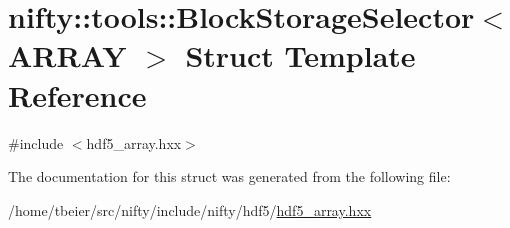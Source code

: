 \hypertarget{structnifty_1_1tools_1_1BlockStorageSelector}{}\section{nifty\+:\+:tools\+:\+:Block\+Storage\+Selector$<$ A\+R\+R\+AY $>$ Struct Template Reference}
\label{structnifty_1_1tools_1_1BlockStorageSelector}


{\ttfamily \#include $<$hdf5\+\_\+array.\+hxx$>$}



The documentation for this struct was generated from the following file\+:\begin{DoxyCompactItemize}
\item 
/home/tbeier/src/nifty/include/nifty/hdf5/\hyperlink{hdf5__array_8hxx}{hdf5\+\_\+array.\+hxx}\end{DoxyCompactItemize}

